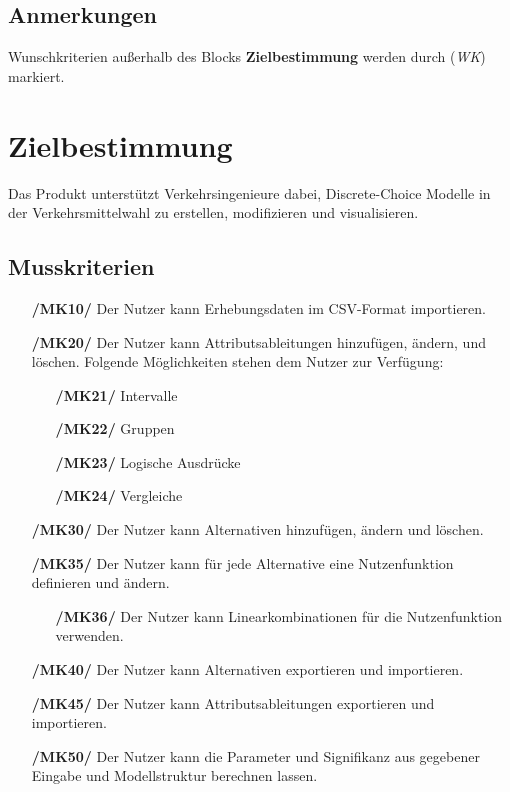 \documentclass{article}
\begin{document}
\subsection{Anmerkungen}
Wunschkriterien außerhalb des Blocks \textbf{Zielbestimmung} werden durch (\textit{WK}) markiert.

\clearpage
\section{Zielbestimmung}
Das Produkt unterstützt Verkehrsingenieure dabei, Discrete-Choice Modelle in der Verkehrsmittelwahl zu erstellen, modifizieren und visualisieren.
\subsection{Musskriterien}
\begin{itemize}
    \item[\textbf{/MK10/}] Der Nutzer kann Erhebungsdaten im CSV-Format importieren.
    \item[\textbf{/MK20/}] Der Nutzer kann Attributsableitungen hinzufügen, ändern, und löschen.
    \newline Folgende Möglichkeiten stehen dem Nutzer zur Verfügung:
    \begin{itemize}[leftmargin=.7in]
        \item[\textbf{/MK21/}] Intervalle
        \item[\textbf{/MK22/}] Gruppen
        \item[\textbf{/MK23/}] Logische Ausdrücke
        \item[\textbf{/MK24/}] Vergleiche
    \end{itemize}
    \item[\textbf{/MK30/}] Der Nutzer kann Alternativen hinzufügen, ändern und löschen.
    \item[\textbf{/MK35/}] Der Nutzer kann für jede Alternative eine Nutzenfunktion definieren und ändern.
    \begin{itemize}[leftmargin=.7in]
        \item[\textbf{/MK36/}] Der Nutzer kann Linearkombinationen für die Nutzenfunktion verwenden.
    \end{itemize}
    \item[\textbf{/MK40/}] Der Nutzer kann Alternativen exportieren und importieren.
    \item[\textbf{/MK45/}] Der Nutzer kann Attributsableitungen exportieren und importieren. 
    \item[\textbf{/MK50/}] Der Nutzer kann die Parameter und Signifikanz aus gegebener Eingabe und Modellstruktur berechnen lassen.

\end{itemize}
\end{document}
